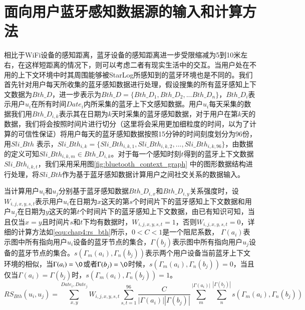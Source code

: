 \section{面向用户蓝牙感知数据源的输入和计算方法}
\label{sec:bl_input}
相比于WiFi设备的感知距离，蓝牙设备的感知距离进一步受限缩减为5到10米左右，在这样短距离的情况下，则可以考虑二者有现实生活中的交互。当用户处在不用的上下文环境中时其周围能够被StarLog所感知到的蓝牙环境也是不同的。我们首先针对用户每天所收集的蓝牙感知数据进行处理，假设搜集的所有蓝牙感知上下文数据为$Bth\_D$，进一步表示为$Bth\_D=\{Bth\_D_{1},Bth\_D_{2},...Bth\_D_{n} \}$，$Bth\_D_{i}$表示用户$u_{i}$在所有时间$Date_{i}$内所采集的蓝牙上下文感知数据。用户$u_{i}$每天采集的数据我们用$Bth\_D_{i,k}$表示其在日期为$k$天时采集的蓝牙感知数据，对于用户在第$k$天的数据，我们将会按照时间片进行切分（这里将会采用更加细粒度的时间，以为了计算的可信性保证）将用户每天的蓝牙感知数据按照15分钟的时间刻度划分为96份，用$Sli\_Bth$ 表示，$Sli\_Bth_{i,k}=\{Sli\_Bth_{i,k,1},Sli\_Bth_{i,k,2},...,Sli\_Bth_{i,k,96}\}$，由数据的定义可知$Sli\_Bth_{i,k,m} \in Bth\_D_{i,k}$。对于每一个感知时刻$t$得到的蓝牙上下文数据$Sli\_Bth_{i,k,t}$，我们采用采用图\ref{fig:bluetooth_context_graph} 中的图形数据结构进行处理，将$Sli\_Bth$作为基于蓝牙感知数据计算用户之间社交关系的数据输入。

\par 当计算用户$u_{i}$和$u_{j}$分别基于蓝牙感知数据$Bth\_D_{i,x}$和$Bth\_D_{i,y}$关系强度时，设$W_{i,j,x,y,s,t}$表示用户$u_{i}$在日期为$x$这天的第$s$个时间片下的蓝牙感知上下文数据和用户$u_{j}$在日期为$y$这天的第$t$个时间片下的蓝牙感知上下文数据，由已有知识可知，当且仅当$x=y$且时间片$s$和$t$下均有数据时，$W_{i,j,x,y,s,t}=1$，否则$W_{i,j,x,y,s,t}=0$，详细的计算方法如\ref{equ:chap4:rs_bth}所示，$0< C<1$是一个阻尼系数， $\Gamma (a_{i}) $表示图中所有指向用户$u_{i}$设备的蓝牙节点的集合，$\Gamma (b_{j}) $表示图中所有指向用户$u_{j}$设备的蓝牙节点的集合。$s(\Gamma_{m} (a_{i}),\Gamma_{n} (b_{j}))$表示两个用户设备当前蓝牙上下文环境的相似，当$\Gamma (a_{i})= \O$或者$\Gamma (b_{j})=\O$时候，$s(\Gamma_{m} (a_{i}),\Gamma_{n} (b_{j}))=0$，当且仅当$\Gamma (a_{i})=\Gamma (b_{j})$时，$s(\Gamma_{m} (a_{i}),\Gamma_{n} (b_{j}))=1$。
\begin{equation}
\label{equ:chap4:rs_bth}
RS_{Bth}(u_{i},u_{j})=\sum_{x ,y }^{ Date_{i}, Date_{j}}W_{i,j,x,y,s,t}\sum_{s,t=1}^{96} \frac{C}{ \left |\Gamma (a_{i})  \right |\left |\Gamma (b_{j})  \right | } \sum_{m}^{\left |\Gamma (a_{i})  \right |}  \sum_{n}^{\left |\Gamma (b_{j})  \right |}s(\Gamma_{m} (a_{i}),\Gamma_{n} (b_{j}))
\end{equation}

